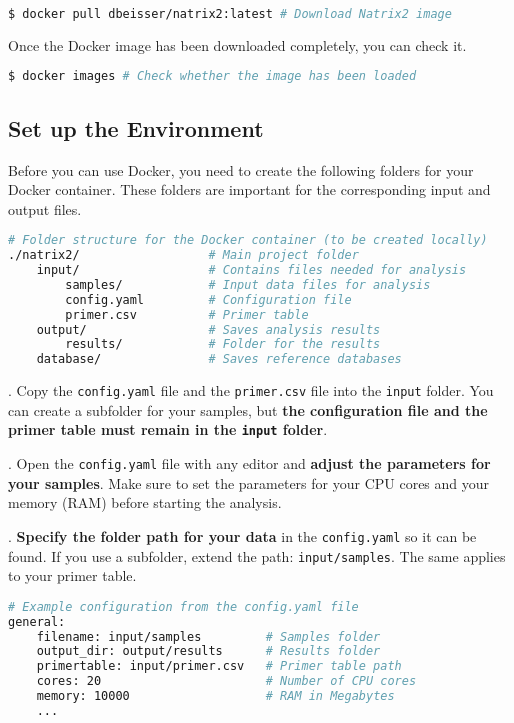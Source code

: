 \documentclass[a4paper,11pt]{article}
\newcommand{\vsp}{\vspace{0.2cm}}
\begin{document}
\begin{lstlisting}[language=bash]
$ docker pull dbeisser/natrix2:latest # Download Natrix2 image
\end{lstlisting}
\vsp
Once the Docker image has been downloaded completely, you can check it.

\begin{lstlisting}[language=bash]
$ docker images # Check whether the image has been loaded
\end{lstlisting}

\subsection{Set up the Environment}
Before you can use Docker, you need to create the following folders for your Docker container. These folders are important for the corresponding input and output files.

\begin{lstlisting}[language=bash]
# Folder structure for the Docker container (to be created locally)
./natrix2/                  # Main project folder
    input/                  # Contains files needed for analysis
        samples/            # Input data files for analysis
        config.yaml         # Configuration file
        primer.csv          # Primer table
    output/                 # Saves analysis results
        results/            # Folder for the results
    database/               # Saves reference databases
\end{lstlisting}
\vsp

. Copy the \texttt{config.yaml} file and the \texttt{primer.csv} file into the \texttt{input} folder. You can create a subfolder for your samples, but \textbf{the configuration file and the primer table must remain in the \texttt{input} folder}.

\vsp
{}. Open the \texttt{config.yaml} file with any editor and \textbf{adjust the parameters for your samples}. Make sure to set the parameters for your CPU cores and your memory (RAM) before starting the analysis.

\vsp
{}. \textbf{Specify the folder path for your data} in the \texttt{config.yaml} so it can be found. If you use a subfolder, extend the path: \texttt{input/samples}. The same applies to your primer table.

\begin{lstlisting}[language=bash]
# Example configuration from the config.yaml file
general:
    filename: input/samples         # Samples folder
    output_dir: output/results      # Results folder
    primertable: input/primer.csv   # Primer table path
    cores: 20                       # Number of CPU cores
    memory: 10000                   # RAM in Megabytes
    ...
\end{lstlisting}
\end{document}
